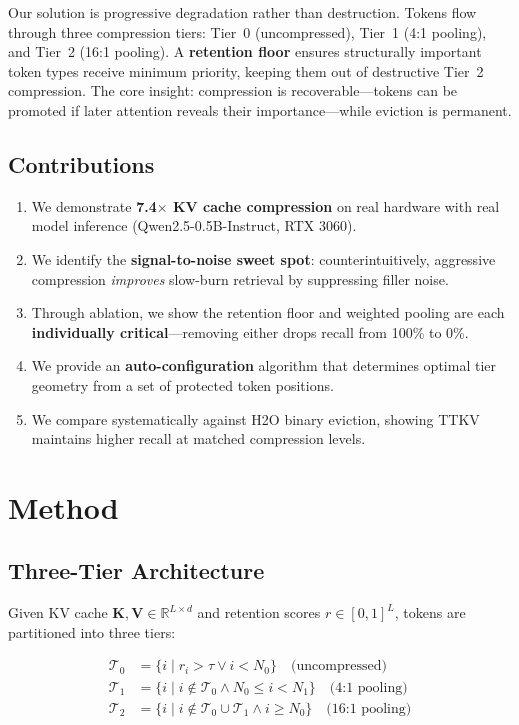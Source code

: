 \documentclass[11pt]{article}
\begin{document}
Our solution is progressive degradation rather than destruction. Tokens flow through three compression tiers: Tier~0 (uncompressed), Tier~1 (4:1 pooling), and Tier~2 (16:1 pooling). A \textbf{retention floor} ensures structurally important token types receive minimum priority, keeping them out of destructive Tier~2 compression. The core insight: compression is recoverable---tokens can be promoted if later attention reveals their importance---while eviction is permanent.

\subsection{Contributions}

\begin{enumerate}
\item We demonstrate \textbf{7.4$\times$ KV cache compression} on real hardware with real model inference (Qwen2.5-0.5B-Instruct, RTX 3060).
\item We identify the \textbf{signal-to-noise sweet spot}: counterintuitively, aggressive compression \textit{improves} slow-burn retrieval by suppressing filler noise.
\item Through ablation, we show the retention floor and weighted pooling are each \textbf{individually critical}---removing either drops recall from 100\% to 0\%.
\item We provide an \textbf{auto-configuration} algorithm that determines optimal tier geometry from a set of protected token positions.
\item We compare systematically against H2O binary eviction, showing TTKV maintains higher recall at matched compression levels.
\end{enumerate}

\section{Method}

\subsection{Three-Tier Architecture}

Given KV cache $\mathbf{K}, \mathbf{V} \in \mathbb{R}^{L \times d}$ and retention scores $r \in [0,1]^L$, tokens are partitioned into three tiers:

\begin{equation}
\begin{aligned}
\mathcal{T}_0 &= \{i \mid r_i > \tau \lor i < N_0\} \quad\text{(uncompressed)} \\
\mathcal{T}_1 &= \{i \mid i \notin \mathcal{T}_0 \land N_0 \leq i < N_1\} \quad\text{(4:1 pooling)} \\
\mathcal{T}_2 &= \{i \mid i \notin \mathcal{T}_0 \cup \mathcal{T}_1 \land i \geq N_0\} \quad\text{(16:1 pooling)}
\end{aligned}
\end{equation}
\end{document}
